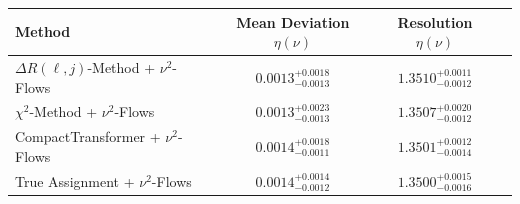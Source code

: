     \begin{tabular}{lccc}
        \toprule
        Method & Mean Deviation $\eta({\nu})$ & Resolution $\eta({\nu})$ \\
        \midrule
        $\Delta R(\ell,j)$-Method + $\nu^2$-Flows & $0.0013^{+0.0018}_{-0.0013}$ & $1.3510^{+0.0011}_{-0.0012}$ \\
        $\chi^2$-Method + $\nu^2$-Flows & $0.0013^{+0.0023}_{-0.0013}$ & $1.3507^{+0.0020}_{-0.0012}$ \\
        CompactTransformer + $\nu^2$-Flows & $0.0014^{+0.0018}_{-0.0011}$ & $1.3501^{+0.0012}_{-0.0014}$ \\
        True Assignment + $\nu^2$-Flows & $0.0014^{+0.0014}_{-0.0012}$ & $1.3500^{+0.0015}_{-0.0016}$ \\
        \bottomrule
    \end{tabular}